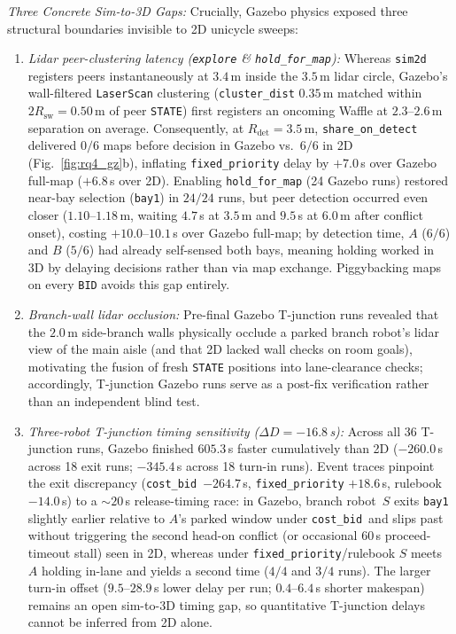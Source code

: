 \documentclass[letterpaper,journal]{IEEEtran}
\newcommand{\cb}{\texttt{cost\_bid}}
\begin{document}
\smallskip\noindent\emph{Three Concrete Sim-to-3D Gaps:} Crucially, Gazebo physics exposed three structural boundaries invisible to 2D unicycle sweeps:
\begin{enumerate}
\item \emph{Lidar peer-clustering latency (\texttt{explore} \& \texttt{hold\_for\_map}):} Whereas \texttt{sim2d} registers peers instantaneously at $3.4$\,m inside the $3.5$\,m lidar circle, Gazebo's wall-filtered \texttt{LaserScan} clustering (\texttt{cluster\_dist} $0.35$\,m matched within $2R_{\mathrm{sw}}=0.50$\,m of peer \texttt{STATE}) first registers an oncoming Waffle at $2.3$--$2.6$\,m separation on average. Consequently, at $R_{\mathrm{det}}=3.5$\,m, \texttt{share\_on\_detect} delivered $0/6$ maps before decision in Gazebo vs.\ $6/6$ in 2D (Fig.~\ref{fig:rq4_gz}b), inflating \texttt{fixed\_priority} delay by $+7.0$\,s over Gazebo full-map ($+6.8$\,s over 2D). Enabling \texttt{hold\_for\_map} (24 Gazebo runs) restored near-bay selection (\texttt{bay1}) in $24/24$ runs, but peer detection occurred even closer ($1.10$--$1.18$\,m, waiting $4.7$\,s at $3.5$\,m and $9.5$\,s at $6.0$\,m after conflict onset), costing $+10.0$--$10.1$\,s over Gazebo full-map; by detection time, $A$ ($6/6$) and $B$ ($5/6$) had already self-sensed both bays, meaning holding worked in 3D by delaying decisions rather than via map exchange. Piggybacking maps on every \texttt{BID} avoids this gap entirely.
\item \emph{Branch-wall lidar occlusion:} Pre-final Gazebo T-junction runs revealed that the $2.0$\,m side-branch walls physically occlude a parked branch robot's lidar view of the main aisle (and that 2D lacked wall checks on room goals), motivating the fusion of fresh \texttt{STATE} positions into lane-clearance checks; accordingly, T-junction Gazebo runs serve as a post-fix verification rather than an independent blind test.
\item \emph{Three-robot T-junction timing sensitivity ($\Delta D=-16.8$\,s):} Across all 36 T-junction runs, Gazebo finished $605.3$\,s faster cumulatively than 2D ($-260.0$\,s across 18 exit runs; $-345.4$\,s across 18 turn-in runs). Event traces pinpoint the exit discrepancy (\cb\ $-264.7$\,s, \texttt{fixed\_priority} $+18.6$\,s, rulebook $-14.0$\,s) to a $\sim 20$\,s release-timing race: in Gazebo, branch robot~$S$ exits \texttt{bay1} slightly earlier relative to $A$'s parked window under \cb\ and slips past without triggering the second head-on conflict (or occasional $60$\,s proceed-timeout stall) seen in 2D, whereas under \texttt{fixed\_priority}/rulebook $S$ meets $A$ holding in-lane and yields a second time ($4/4$ and $3/4$ runs). The larger turn-in offset ($9.5$--$28.9$\,s lower delay per run; $0.4$--$6.4$\,s shorter makespan) remains an open sim-to-3D timing gap, so quantitative T-junction delays cannot be inferred from 2D alone.
\end{enumerate}
\end{document}
